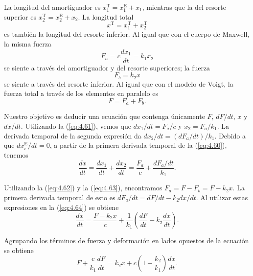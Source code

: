 \documentclass[12pt]{book}
\begin{document}
La longitud del amortiguador es $x_1^{\text{T}} = x_1^{\text{E}} + x_1$, mientras que la del resorte superior es $x_2^{\text{T}} = x_2^{\text{E}} + x_2$. La longitud total
\begin{equation}
x^{\text{T}} = x_1^{\text{T}} + x_2^{\text{T}}
\label{eq:4.60}
\end{equation}
es también la longitud del resorte inferior. Al igual que con el cuerpo de Maxwell, la misma fuerza
\begin{equation}
F_a = c\frac{dx_1}{dt} = k_1 x_2
\label{eq:4.61}
\end{equation}
se siente a través del amortiguador y del resorte superiores; la fuerza
\begin{equation}
F_b = k_2 x
\label{eq:4.62}
\end{equation}
se siente a través del resorte inferior. Al igual que con el modelo de Voigt, la fuerza total a través de los elementos en paralelo es
\begin{equation}
F = F_a + F_b.
\label{eq:4.63}
\end{equation}

Nuestro objetivo es deducir una ecuación que contenga únicamente $F$, $dF/dt$, $x$ y $dx/dt$. Utilizando la (\ref{eq:4.61}), vemos que $dx_1/dt = F_a/c$ y $x_2 = F_a/k_1$. La derivada temporal de la segunda expresión da $dx_2/dt = (dF_a/dt)/k_1$. Debido a que $dx_i^{\text{E}}/dt = 0$, a partir de la primera derivada temporal de la (\ref{eq:4.60}), tenemos
\begin{equation}
\frac{dx}{dt} = \frac{dx_1}{dt} + \frac{dx_2}{dt} = \frac{F_a}{c} + \frac{dF_a/dt}{k_1}.
\label{eq:4.64}
\end{equation}

Utilizando la (\ref{eq:4.62}) y la (\ref{eq:4.63}), encontramos $F_a = F - F_b = F - k_2 x$. La primera derivada temporal de esto es $dF_a/dt = dF/dt - k_2 dx/dt$. Al utilizar estas expresiones en la (\ref{eq:4.64}) se obtiene
\begin{equation}
\frac{dx}{dt} = \frac{F - k_2 x}{c} + \frac{1}{k_1} \left( \frac{dF}{dt} - k_2 \frac{dx}{dt} \right).
\label{eq:4.65}
\end{equation}

Agrupando los términos de fuerza y deformación en lados opuestos de la ecuación se obtiene
\begin{equation}
F + \frac{c}{k_1} \frac{dF}{dt} = k_2 x + c \left( 1 + \frac{k_2}{k_1} \right) \frac{dx}{dt}.
\label{eq:4.66}
\end{equation}
\end{document}
